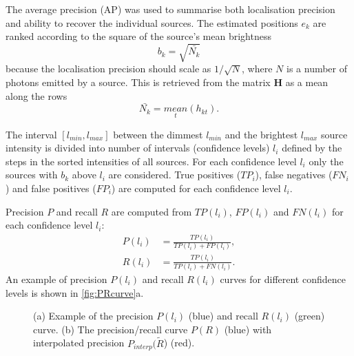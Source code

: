 The average precision (AP) \cite{Salton1986,Everingham2009} was used to summarise both localisation precision and ability to recover the individual sources. The estimated positions $e_{k}$ are ranked according to the square of the source's mean brightness
%
\begin{equation}
	b_{k}=\sqrt{\bar{N_{k}}}
\end{equation}
%
because the localisation precision should scale as $1/\sqrt{N}$, where $N$ is a number of photons emitted by a source. This is retrieved from the matrix $\bm{H}$ as a mean along the rows
%
\begin{equation}
	\bar{N_{k}}=\underset{t}{\unit{mean}}(h_{kt}).
\end{equation}

The interval $[l_{min},l_{max}]$ between the dimmest $l_{min}$ and the brightest $l_{max}$ source intensity is divided into number of intervals (confidence levels) $l_{i}$ defined by the steps in the sorted intensities of all sources. For each confidence level $l_i$ only the sources with $b_{k}$ above $l_i$ are considered. True positives ($\unit{TP}_{i}$), false negatives ($\unit{FN}_{i}$) and false positives ($\unit{FP}_{i}$) are computed for each confidence level $l_{i}$.

Precision $P$ and recall $R$ are computed from $\unit{TP}(l_{i})$, $\unit{FP}(l_{i})$ and $\unit{FN}(l_{i})$ for each confidence level $l_i$:
%
\begin{align} \label{eq:TP,FN} 
	P(l_i)& = \frac{\unit{TP}(l_i)}{\unit{TP}(l_i)+\unit{FP}(l_i)},\\
	R(l_i)& = \frac{\unit{TP}(l_i)}{\unit{TP}(l_i)+\unit{FN}(l_i)}.
\end{align}
%
An example of precision $P(l_{i})$ and recall $R(l_{i})$ curves for different confidence levels is shown in \autoref{fig:PRcurve}a. 
%
\begin{figure}[!h]
	\newcommand{\widthfig}{.5\textwidth}
	\newcommand{\sizefig}{.4}
	\centering
	\caption{(a) Example of the precision $P(l_{i})$ (blue) and recall $R(l_{i})$ (green) curve. (b) The precision/recall curve $P(R)$ (blue) with interpolated precision $P_{interp}(\tilde{R}$) (red).}
	\label{fig:PRcurve}
\end{figure}

